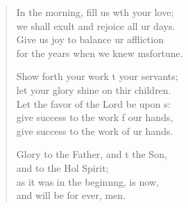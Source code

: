 \begin{verse}
\begin{patverse}
In the morning, fill us w\pointup{\i}th your love;\Med\\
we shall exult and rejoice all ur days.\\
Give us joy to balance ur affliction\Med\\
for the years when we knew m\pointup{\i}sfortune.

Show forth your work t your servants;\Med\\
let your glory shine on thir children.\\
Let the favor of the Lord be upon s:\Flex\\
give success to the work f our hands,\Med\\
give success to the work of ur hands.

Glory to the Father, and t the Son,\Med\\
and to the Hol Spirit;\\
as it was in the beginn\pointup{\i}ng, is now,\Med\\
and will be for ever, men.
  \end{patverse}
\end{verse}
